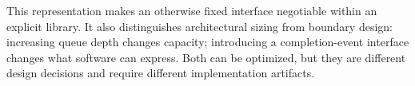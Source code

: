 This representation makes an otherwise fixed interface negotiable within an explicit library. It also distinguishes architectural sizing from boundary design: increasing queue depth changes capacity; introducing a completion-event interface changes what software can express. Both can be optimized, but they are different design decisions and require different implementation artifacts.
